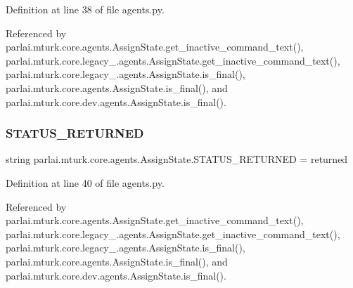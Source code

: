 Definition at line 38 of file agents.\+py.



Referenced by parlai.\+mturk.\+core.\+agents.\+Assign\+State.\+get\+\_\+inactive\+\_\+command\+\_\+text(), parlai.\+mturk.\+core.\+legacy\+\_.\+agents.\+Assign\+State.\+get\+\_\+inactive\+\_\+command\+\_\+text(), parlai.\+mturk.\+core.\+legacy\+\_.\+agents.\+Assign\+State.\+is\+\_\+final(), parlai.\+mturk.\+core.\+agents.\+Assign\+State.\+is\+\_\+final(), and parlai.\+mturk.\+core.\+dev.\+agents.\+Assign\+State.\+is\+\_\+final().

\mbox{\label{classparlai_1_1mturk_1_1core_1_1agents_1_1AssignState_a0d0bdd6ec3b881635fc9ed3283903f7a}} 
\subsubsection{\texorpdfstring{S\+T\+A\+T\+U\+S\+\_\+\+R\+E\+T\+U\+R\+N\+ED}{STATUS\_RETURNED}}
{\footnotesize\ttfamily string parlai.\+mturk.\+core.\+agents.\+Assign\+State.\+S\+T\+A\+T\+U\+S\+\_\+\+R\+E\+T\+U\+R\+N\+ED = \textquotesingle{}returned\textquotesingle{}\hspace{0.3cm}{\ttfamily [static]}}



Definition at line 40 of file agents.\+py.



Referenced by parlai.\+mturk.\+core.\+agents.\+Assign\+State.\+get\+\_\+inactive\+\_\+command\+\_\+text(), parlai.\+mturk.\+core.\+legacy\+\_.\+agents.\+Assign\+State.\+get\+\_\+inactive\+\_\+command\+\_\+text(), parlai.\+mturk.\+core.\+legacy\+\_.\+agents.\+Assign\+State.\+is\+\_\+final(), parlai.\+mturk.\+core.\+agents.\+Assign\+State.\+is\+\_\+final(), and parlai.\+mturk.\+core.\+dev.\+agents.\+Assign\+State.\+is\+\_\+final().

\mbox{\label{classparlai_1_1mturk_1_1core_1_1agents_1_1AssignState_aabbbd889d7189a6d858727dca3f72a9d}} 
